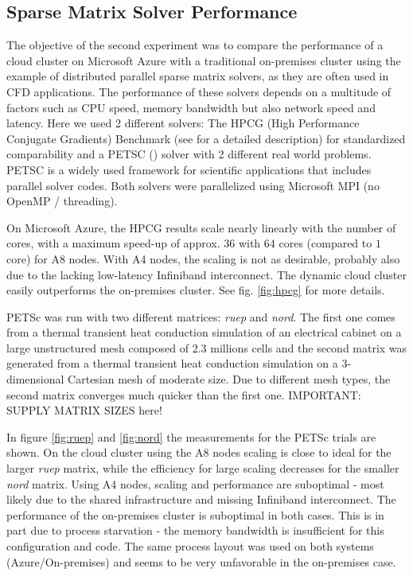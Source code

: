 \documentclass[3p,times]{elsarticle}
\begin{document}
\subsection{Sparse Matrix Solver Performance}
The objective of the second experiment was to compare the performance of a cloud cluster on Microsoft Azure with a traditional on-premises cluster using the example of distributed parallel sparse matrix solvers, as they are often used in CFD applications. The performance of these solvers depends on a multitude of factors such as CPU speed, memory bandwidth but also network speed and latency. Here we used 2 different solvers: The HPCG (High Performance Conjugate Gradients) Benchmark (see \cite{hpcg} for a detailed description) for standardized comparability and a PETSC (\cite{petsc}) solver with 2 different real world problems. PETSC is a widely used framework for scientific applications that includes parallel solver codes.
Both solvers were parallelized using Microsoft MPI (no OpenMP / threading).

On Microsoft Azure, the HPCG results scale nearly linearly with the number of cores, with a maximum speed-up of approx. $36$ with $64$ cores (compared to $1$ core) for A8 nodes. With A4 nodes, the scaling is not as desirable, probably also due to the lacking low-latency Infiniband interconnect. The dynamic cloud cluster easily outperforms the on-premises cluster. See fig. \ref{fig:hpcg} for more details.

PETSc was run with two different matrices: \textit{ruep} and \textit{nord}. The first one comes from a thermal transient heat conduction simulation of an electrical cabinet on a large unstructured mesh composed of 2.3 millions cells and the second matrix was generated from a thermal transient heat conduction simulation on a 3-dimensional Cartesian mesh of moderate size. Due to different mesh types, the second matrix converges much quicker than the first one.  \textcolor[rgb]{1,0,0}{IMPORTANT: SUPPLY MATRIX SIZES here!}

In figure \ref{fig:ruep} and \ref{fig:nord} the measurements for the PETSc trials are shown. On the cloud cluster using the A8 nodes scaling is close to ideal for the larger \textit{ruep} matrix, while the efficiency for large scaling decreases for the smaller \textit{nord} matrix. Using A4 nodes, scaling and performance are suboptimal - most likely due to the shared infrastructure and missing Infiniband interconnect.  The performance of the on-premises cluster is suboptimal in both cases. This is in part due to process starvation - the memory bandwidth is insufficient for this configuration and code. The same process layout was used on both systems (Azure/On-premises) and seems to be very unfavorable in the on-premises case.
\end{document}
